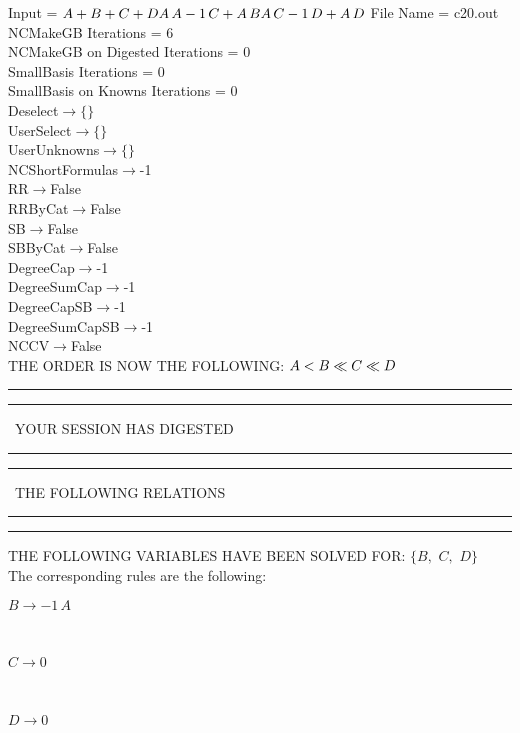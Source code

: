 \documentclass[rep10,leqno]{report}
\begin{document}
\normalsize
\baselineskip=12pt
\noindent
Input = 
$
\\A + B + C + D\\
A\,
 A\\
-1\,
 C + A\,
 B\\
A\,
 C\\
-1\,
 D + A\,
 D\\
$
File Name = c20.out\\
NCMakeGB Iterations = 6\\
NCMakeGB on Digested Iterations = 0\\
SmallBasis Iterations = 0\\
SmallBasis on Knowns Iterations = 0\\
Deselect$\rightarrow \{\}$\\
UserSelect$\rightarrow \{\}$\\
UserUnknowns$\rightarrow \{\}$\\
NCShortFormulas$\rightarrow$-1\\
RR$\rightarrow $False\\
RRByCat$\rightarrow $False\\
SB$\rightarrow $False\\
SBByCat$\rightarrow $False\\
DegreeCap$\rightarrow $-1\\
DegreeSumCap$\rightarrow $-1\\
DegreeCapSB$\rightarrow $-1\\
DegreeSumCapSB$\rightarrow $-1\\
NCCV$\rightarrow $False\\
THE ORDER IS NOW THE FOLLOWING:\hfil\break
$
A<B\ll
C\ll
D\\
$
\rule[2pt]{6in}{4pt}\hfil\break
\rule[2pt]{1.879in}{4pt}
\ YOUR SESSION HAS DIGESTED\ 
\rule[2pt]{1.879in}{4pt}\hfil\break
\rule[2pt]{1.923in}{4pt}
\ THE FOLLOWING RELATIONS\ 
\rule[2pt]{1.923in}{4pt}\hfil\break
\rule[2pt]{6in}{4pt}\hfil\break
THE FOLLOWING VARIABLES HAVE BEEN SOLVED FOR:\hfil\break
$\{B,
$ $
C,
$ $
D\}$
\smallskip\\
The corresponding rules are the following:\smallskip\\
\begin{minipage}{6in}
$
B\rightarrow -1\,
 A
$
\end{minipage}\medskip\\
\begin{minipage}{6in}
$
C\rightarrow 0
$
\end{minipage}\medskip\\
\begin{minipage}{6in}
$
D\rightarrow 0
$
\end{minipage}\medskip\\
\end{document}
